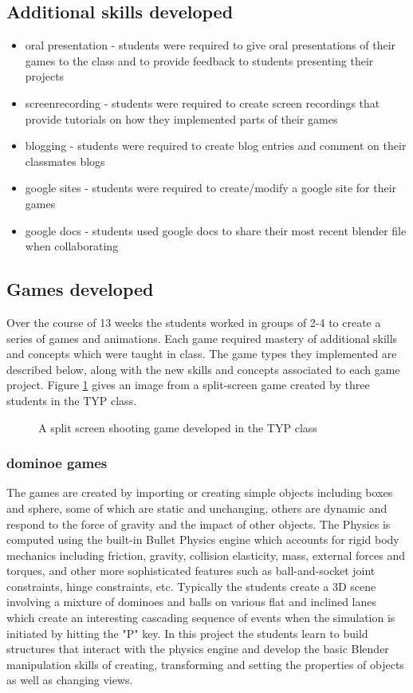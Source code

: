 \documentclass{sig-alternate}
\begin{document}
\subsection{Additional skills developed}
\begin{itemize}
\item oral presentation - students were required to give oral presentations of their games to the class
and to provide feedback to students presenting their projects
\item screenrecording - students were required to create screen recordings that provide tutorials on
how they implemented parts of their games
\item blogging - students were required to create blog entries and comment on their classmates blogs
\item google sites - students were required to create/modify a google site for their games
\item google docs - students used google docs to share their most recent blender file when collaborating
\end{itemize}
\subsection{Games developed}
Over the course of 13 weeks the students worked in groups of 2-4 to create a series of games and animations. Each game required mastery of additional skills and concepts which were taught in class.
The game types they implemented are described below, along with the new skills and concepts associated to each game project. Figure \ref{fig:ssgame} gives an image from a split-screen game created by three students in the TYP class.
\begin{figure}
\centering
{}
\caption{A split screen shooting game developed in the TYP class}
\label{fig:ssgame}
\end{figure}

\subsubsection{ dominoe games} The games are created by importing or creating simple objects including boxes and sphere, some of which are static and unchanging, others are dynamic and respond to the force of gravity and the impact of other objects. The Physics is computed using the built-in Bullet Physics engine which accounts for rigid body mechanics including friction, gravity, collision elasticity, mass, external forces and torques, and other more sophisticated features such as ball-and-socket joint constraints, hinge constraints, etc. Typically the students create a 3D scene involving a mixture of dominoes and balls on various flat and inclined lanes which create an interesting cascading sequence
of events when the simulation is initiated by hitting the "P" key. In this project the students learn to build structures that interact with the physics engine and develop the basic Blender manipulation skills of
creating, transforming and setting the properties of objects as well as changing views.
\end{document}
